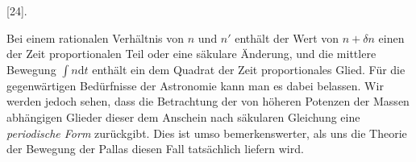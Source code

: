 \par{}\bigskip
{}
\begin{center}[24].\end{center}
\begingroup
\makeatletter
\def\@makefnmark{\hbox{\normalfont\@thefnmark}}
\makeatother
\noindent\hspace*{\parindent}Bei einem rationalen Verhältnis von \(n\text{ und }n'\) enthält der Wert von \(n+\delta n\) einen der Zeit proportionalen Teil oder eine säkulare Änderung, und die mittlere Bewegung \(\int n\mathrm{d}t\) enthält ein dem Quadrat der Zeit proportionales Glied. Für die gegenwärtigen Bedürfnisse der Astronomie kann man es dabei belassen. Wir werden jedoch sehen, dass die Betrachtung der von höheren Potenzen der Massen abhängigen Glieder dieser dem Anschein nach säkularen Gleichung eine \textit{periodische Form} zurückgibt. Dies ist umso bemerkenswerter, als uns die Theorie der Bewegung der Pallas diesen Fall tatsächlich liefern wird\HistoricalNoteEight{Siehe S. 557---559.] }.
\par\endgroup
